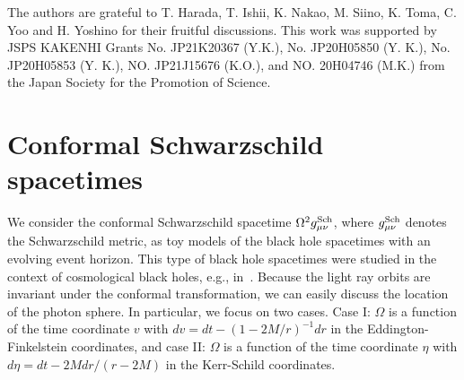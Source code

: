 \documentclass[prd,showpacs,preprintnumbers,groupedaddress,superscriptaddress,nofootinbib,11pt]{revtex4-1} %
\theoremstyle{newplain}
\newcommand{\red}[1]{\textcolor{red}{#1}}
\begin{document}

\begin{acknowledgments}
The authors are grateful to T. Harada, T. Ishii, K. Nakao, M. Siino, K. Toma, C. Yoo and H. Yoshino for their fruitful discussions.
%
This work was supported by JSPS KAKENHI Grants No. JP21K20367 (Y.K.), No. JP20H05850 (Y. K.), No. JP20H05853 (Y. K.), NO. JP21J15676 (K.O.), and NO. 20H04746 (M.K.) from the Japan Society for the Promotion of Science.
\end{acknowledgments}

\afterpage{\clearpage}
\newpage

\appendix


\section{Conformal Schwarzschild spacetimes}
\label{sec:conf-sch}
We consider the conformal Schwarzschild spacetime $\Omega^2 g^{\rm Sch}_{\mu \nu}$, where $g^{\rm Sch}_{\mu \nu}$ denotes the Schwarzschild metric, as toy models of the 
black hole spacetimes with an evolving event horizon.
This type of black hole spacetimes were studied in the context of cosmological black holes, e.g., in~\cite{Thakurta1981, Sultana:2005tp}.
Because the light ray orbits are invariant under the conformal transformation,
we can easily discuss the location of the photon sphere.
In particular, we focus on two cases. 
Case I: $\Omega$ is a function of 
the time coordinate $v$  with $dv = dt - (1-2M/r)^{-1}dr$ in the Eddington-Finkelstein coordinates, 
and 
case II: $\Omega$ is a function of 
the time coordinate $\eta$ with $d\eta = dt - 2M dr/(r-2M)$ in the Kerr-Schild coordinates.
\end{document}
